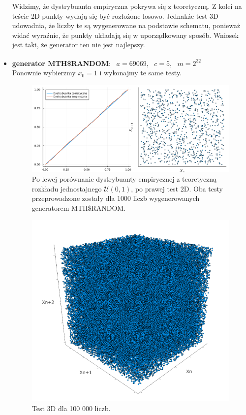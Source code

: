 \documentclass[12pt]{mwrep}
\begin{document}
\begin{itemize}[leftmargin=10mm]
\begin{figure}[H]
		\end{figure}
		Widzimy, że dystrybuanta empiryczna pokrywa się z teoretyczną. Z kolei na teście 2D punkty wydają się być rozłożone losowo. Jednakże test 3D udowadnia, że liczby te są wygenerowane na podstawie schematu, ponieważ widać wyraźnie, że punkty układają się w uporządkowany sposób. Wniosek jest taki, że generator ten nie jest najlepszy.
		\vspace{6mm}
		
		\item \textbf{generator MTH\$RANDOM}\textsuperscript{\cite{generator}}: \ $a = 69069$, \ $c = 5$, \ $m = 2^{32}$\\
		Ponownie wybierzmy $x_0 = 1$ i wykonajmy te same testy.
		\begin{figure}[H]
			\centering
			\caption{Po lewej porównanie dystrybuanty empirycznej z teoretyczną rozkładu jednostajnego $\mathcal{U}(0, 1)$, po prawej test 2D. Oba testy przeprowadzone zostały dla 1000 liczb wygenerowanych generatorem MTH\$RANDOM.}
			\includegraphics[scale=0.1]{fig/fig_gen3.png}
		\end{figure}
		\begin{figure}[H]
			\centering
			\caption{Test 3D dla 100 000 liczb.}
			\includegraphics[scale=0.7]{fig/fig_gen4.png}

\end{figure}
\end{itemize}
\end{document}
